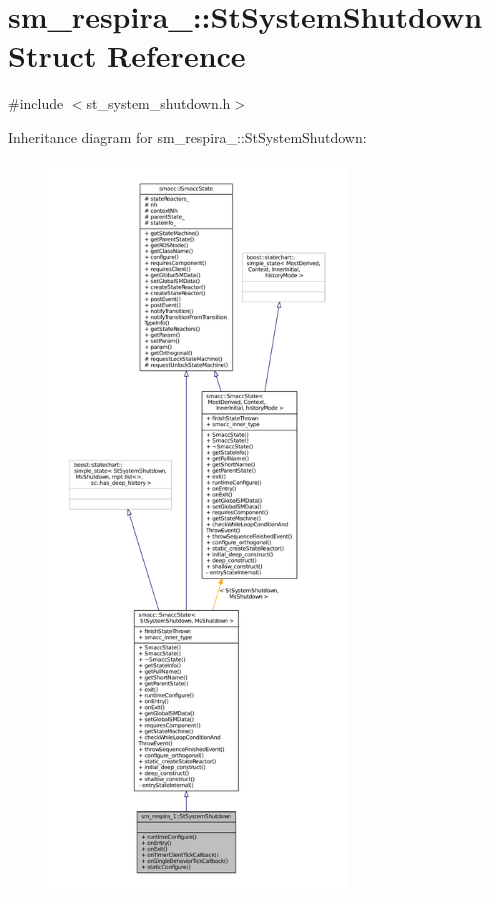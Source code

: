 \hypertarget{structsm__respira__1_1_1StSystemShutdown}{}\section{sm\+\_\+respira\+\_\+:\+:St\+System\+Shutdown Struct Reference}
\label{structsm__respira__1_1_1StSystemShutdown}


{\ttfamily \#include $<$st\+\_\+system\+\_\+shutdown.\+h$>$}



Inheritance diagram for sm\+\_\+respira\+\_\+:\+:St\+System\+Shutdown\+:
\nopagebreak
\begin{figure}[H]
\begin{center}
\leavevmode
\includegraphics[height=550pt]{structsm__respira__1_1_1StSystemShutdown__inherit__graph}
\end{center}
\end{figure}


